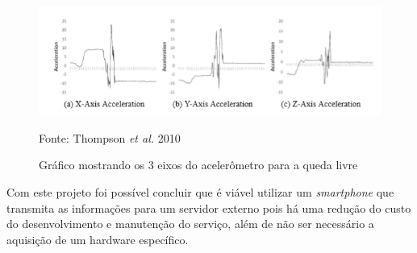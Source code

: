  \begin{figure}[H]

 \caption{Gráfico mostrando os 3 eixos do acelerômetro para a queda livre}
  \includegraphics[width=150mm]{images/Cap2/acelerometro_quedalivre.png}
  
    \scriptsize Fonte: Thompson \textit{et al.} 2010
  \end{figure}



Com este projeto foi possível concluir que é viável utilizar um \textit{smartphone} que transmita as informações para um servidor externo pois há uma redução do custo do desenvolvimento e manutenção do serviço, além de não ser necessário a aquisição de um hardware específico.

